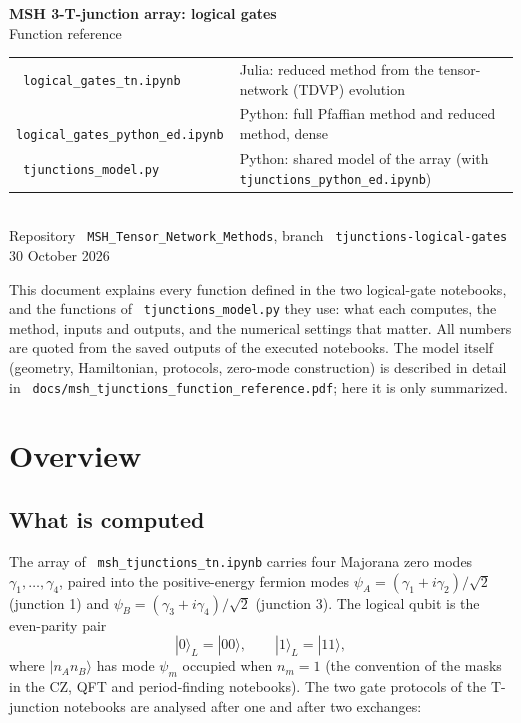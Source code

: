\documentclass[11pt]{article}
\renewcommand{\code}[1]{\texttt{\hyphenchar\font=-1 #1}}
\newcommand{\ket}[1]{|#1\rangle}
\begin{document}
\begin{center}
{\LARGE\bfseries MSH 3-T-junction array: logical gates}\\[0.5em]
{\Large Function reference}\\[1.2em]
\begin{tabular}{lp{8.6cm}}
\code{logical\_gates\_tn.ipynb} & Julia: reduced method from the tensor-network (TDVP) evolution\\
\code{logical\_gates\_python\_ed.ipynb} & Python: full Pfaffian method and reduced method, dense\\
\code{tjunctions\_model.py} & Python: shared model of the array (with \code{tjunctions\_python\_ed.ipynb})\\
\end{tabular}\\[1.2em]
Repository \code{MSH\_Tensor\_Network\_Methods}, branch \code{tjunctions-logical-gates}\\[0.3em]
30 October 2026
\end{center}

\vspace{1em}
\noindent This document explains every function defined in the two logical-gate notebooks, and the functions of
\code{tjunctions\_model.py} they use: what each computes, the method, inputs and outputs, and the numerical settings that matter.
All numbers are quoted from the saved outputs of the executed notebooks. The model itself (geometry, Hamiltonian, protocols, zero-mode
construction) is described in detail in \code{docs/msh\_tjunctions\_function\_reference.pdf}; here it is only summarized.

\tableofcontents
\clearpage

\section{Overview}

\subsection{What is computed}

The array of \code{msh\_tjunctions\_tn.ipynb} carries four Majorana zero modes $\gamma_1,\dots,\gamma_4$, paired into the positive-energy
fermion modes $\psi_A = (\gamma_1 + i\gamma_2)/\sqrt2$ (junction 1) and $\psi_B = (\gamma_3 + i\gamma_4)/\sqrt2$ (junction 3). The logical qubit
is the even-parity pair
\[
\ket0_L = \ket{00},\qquad \ket1_L = \ket{11},
\]
where $\ket{n_An_B}$ has mode $\psi_m$ occupied when $n_m = 1$ (the convention of the masks in the CZ, QFT and period-finding notebooks).
The two gate protocols of the T-junction notebooks are analysed after one and after two exchanges:
\end{document}
